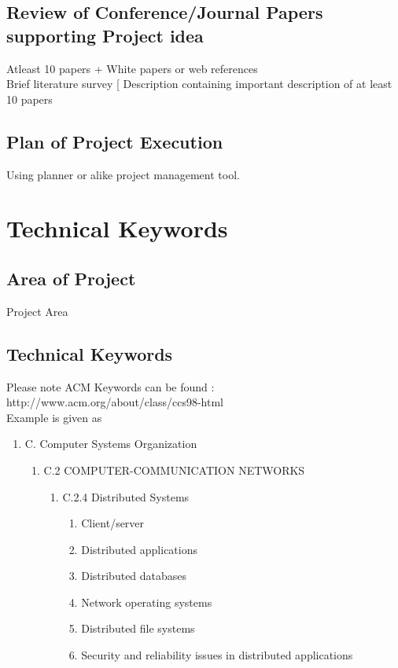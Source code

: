 \documentclass[oneside,a4paper,12pt]{report}
\begin{document}
\section{Review of Conference/Journal Papers supporting Project idea}
\label{sec:survey}
   Atleast 10 papers + White papers or web references\\
   Brief literature survey [ Description containing important description of at least 10 papers

\section{Plan of Project Execution}
  Using planner or alike project management tool.



\chapter{Technical Keywords}
\section{Area of Project}
Project Area

\section{Technical Keywords}
Please note ACM Keywords can be found : http://www.acm.org/about/class/ccs98-html \\
Example is given as

\begin{enumerate}
	\item C. Computer Systems Organization 
	\begin{enumerate}
		\item C.2 COMPUTER-COMMUNICATION NETWORKS 
		\begin{enumerate}
			\item C.2.4 Distributed Systems 
			\begin{enumerate}
				\item  Client/server 
\item Distributed applications
\item Distributed databases
\item Network operating systems 
\item Distributed file systems
\item Security and reliability issues in distributed applications
	 		\end{enumerate} 
		\end{enumerate} 
	  

	
	\end{enumerate}
\end{enumerate}
\end{document}
